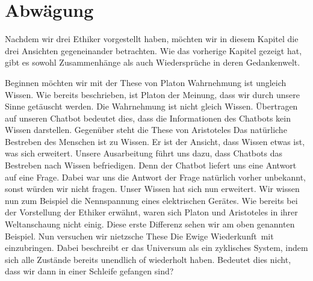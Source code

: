 \section{Abwägung}

Nachdem wir drei Ethiker vorgestellt haben, möchten wir in diesem Kapitel die drei Ansichten gegeneinander betrachten. Wie das vorherige Kapitel gezeigt hat, gibt es sowohl Zusammenhänge als auch Wiedersprüche in deren Gedankenwelt.

Beginnen möchten wir mit der These von Platon \glqq Wahrnehmung ist ungleich Wissen\grqq. Wie bereits beschrieben, ist Platon der Meinung, dass wir durch unsere Sinne getäuscht werden. Die Wahrnehmung ist nicht gleich Wissen. Übertragen auf unseren Chatbot bedeutet dies, dass die Informationen des Chatbots kein Wissen darstellen. \newline	
Gegenüber steht die These von Aristoteles \glqq Das natürliche Bestreben des Menschen ist zu Wissen\grqq. Er ist der Ansicht, dass Wissen etwas ist, was sich erweitert. Unsere Ausarbeitung führt uns dazu, dass Chatbots das Bestreben nach Wissen befriedigen. Denn der Chatbot liefert uns eine Antwort auf eine Frage. Dabei war uns die Antwort der Frage natürlich vorher unbekannt, sonst würden wir nicht fragen. Unser Wissen hat sich nun erweitert. Wir wissen nun zum Beispiel die Nennspannung eines elektrischen Gerätes. Wie bereits bei der Vorstellung der Ethiker erwähnt, waren sich Platon und Aristoteles in ihrer Weltanschaung nicht einig. Diese erste Differenz sehen wir am oben genannten Beispiel. \newline
Nun versuchen wir nietzsche These \glqq Die Ewige Wiederkunft\grqq\ mit einzubringen. Dabei beschreibt er das Universum als ein zyklisches System, indem sich alle Zustände bereits unendlich of wiederholt haben. Bedeutet dies nicht, dass wir dann in einer Schleife gefangen sind? 



